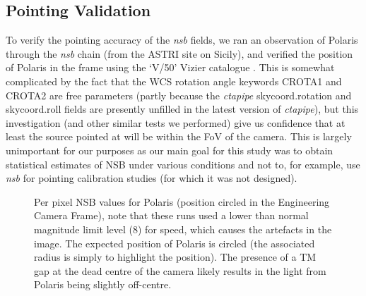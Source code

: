 \subsection{Pointing Validation}
To verify the pointing accuracy of the \textit{nsb} fields, we ran an observation of Polaris through the \textit{nsb} chain (from the ASTRI site on Sicily), and verified the position of Polaris in the frame using the `V/50' Vizier catalogue \cite{vizier}. This is somewhat complicated by the fact that the WCS rotation angle keywords CROTA1 and CROTA2 are free parameters (partly because the \textit{ctapipe} skycoord.rotation and skycoord.roll fields are presently unfilled in the latest version of \textit{ctapipe}), but this investigation (and other similar tests we performed) give us confidence that at least the source pointed at will be within the FoV of the camera. This is largely unimportant for our purposes as our main goal for this study was to obtain statistical estimates of NSB under various conditions and not to, for example, use \textit{nsb} for pointing calibration studies (for which it was not designed).
\begin{figure}[ht!]
\begin{centering}
\caption{Per pixel NSB values for Polaris (position circled in the Engineering Camera Frame), note that these runs used a lower than normal magnitude limit level (8) for speed, which causes the artefacts in the image. The expected position of Polaris is circled (the associated radius is simply to highlight the position). The presence of a TM gap at the dead centre of the camera likely results in the light from Polaris being slightly off-centre.}
\label{fig:polaris}
\end{centering}
\end{figure} 

